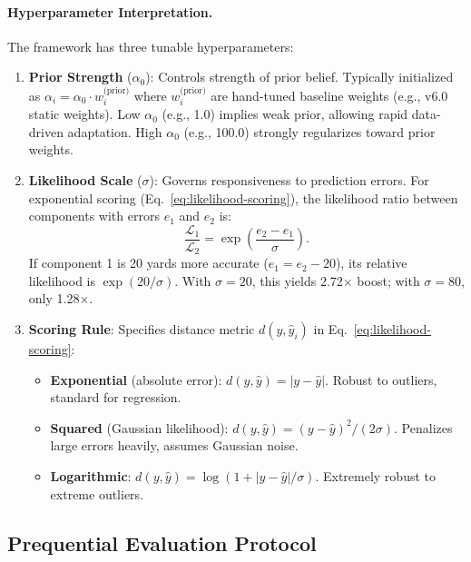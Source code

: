 \paragraph{Hyperparameter Interpretation.}
The framework has three tunable hyperparameters:

\begin{enumerate}
\item \textbf{Prior Strength} ($\alpha_0$): Controls strength of prior belief. Typically initialized as $\alpha_i = \alpha_0 \cdot w_i^{\text{(prior)}}$ where $w_i^{\text{(prior)}}$ are hand-tuned baseline weights (e.g., v6.0 static weights). Low $\alpha_0$ (e.g., 1.0) implies weak prior, allowing rapid data-driven adaptation. High $\alpha_0$ (e.g., 100.0) strongly regularizes toward prior weights.

\item \textbf{Likelihood Scale} ($\sigma$): Governs responsiveness to prediction errors. For exponential scoring (Eq.~\ref{eq:likelihood-scoring}), the likelihood ratio between components with errors $e_1$ and $e_2$ is:
\begin{equation}
\frac{\mathcal{L}_1}{\mathcal{L}_2} = \exp\left(\frac{e_2 - e_1}{\sigma}\right).
\end{equation}
If component 1 is 20 yards more accurate ($e_1 = e_2 - 20$), its relative likelihood is $\exp(20/\sigma)$. With $\sigma=20$, this yields 2.72$\times$ boost; with $\sigma=80$, only 1.28$\times$.

\item \textbf{Scoring Rule}: Specifies distance metric $d(y, \hat{y}_i)$ in Eq.~\ref{eq:likelihood-scoring}:
\begin{itemize}
\item \textbf{Exponential} (absolute error): $d(y, \hat{y}) = |y - \hat{y}|$. Robust to outliers, standard for regression.
\item \textbf{Squared} (Gaussian likelihood): $d(y, \hat{y}) = (y - \hat{y})^2 / (2\sigma)$. Penalizes large errors heavily, assumes Gaussian noise.
\item \textbf{Logarithmic}: $d(y, \hat{y}) = \log(1 + |y - \hat{y}|/\sigma)$. Extremely robust to extreme outliers.
\end{itemize}
\end{enumerate}

\subsection{Prequential Evaluation Protocol}
\label{subsec:prequential-protocol}

